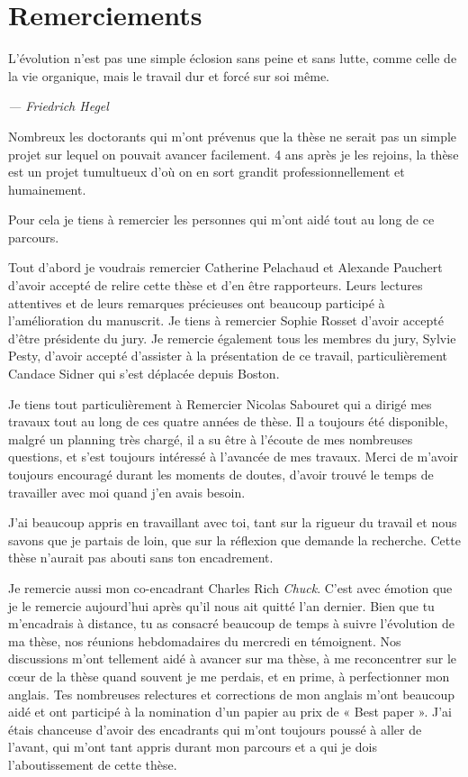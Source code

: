 \chapter{Remerciements}
\thispagestyle{empty}
{}

\vspace*{3cm}

\epigraph{L’évolution n’est pas une simple éclosion sans peine et sans lutte, comme celle de la vie organique, mais le travail dur et forcé sur soi même.}{\textit{    --- Friedrich Hegel	}}

\medskip

Nombreux les doctorants qui m'ont prévenus que la thèse ne serait pas un simple projet sur lequel on pouvait avancer facilement. 4 ans après je les rejoins, la thèse est un projet tumultueux d'où on en sort grandit professionnellement et humainement.

Pour cela je tiens à remercier les personnes qui m'ont aidé tout au long de ce parcours.

Tout d'abord je voudrais remercier Catherine Pelachaud et Alexande Pauchert d’avoir accepté de relire cette thèse et d’en être rapporteurs. Leurs lectures attentives et de leurs remarques précieuses ont beaucoup participé à l'amélioration du manuscrit. Je tiens à remercier Sophie Rosset d’avoir accepté d’être présidente du jury. Je remercie également tous les membres du jury, Sylvie Pesty, d’avoir accepté d’assister à la présentation de ce travail, particulièrement Candace Sidner qui s’est déplacée depuis Boston.

Je tiens tout particulièrement à Remercier Nicolas Sabouret qui a dirigé mes travaux tout au long de ces quatre années de thèse. 
Il a toujours été disponible, malgré un planning très chargé, il a su être à l’écoute de mes nombreuses questions, et s’est toujours intéressé à l’avancée de mes travaux. 
Merci de m'avoir toujours encouragé durant les moments de doutes, d'avoir trouvé le temps de travailler avec moi quand j'en avais besoin. 

J'ai beaucoup appris en travaillant avec toi, tant sur la rigueur du travail et nous savons que je partais de loin, que sur la réflexion que demande la recherche. 
Cette thèse n'aurait pas abouti sans ton encadrement. 

Je remercie aussi mon co-encadrant Charles Rich \emph{Chuck}. C'est avec émotion que je le remercie aujourd'hui après qu'il nous ait quitté l'an dernier. 
Bien que tu m'encadrais à distance, tu as consacré beaucoup de temps à suivre l’évolution de ma thèse, nos réunions hebdomadaires du mercredi en témoignent.  Nos discussions m’ont tellement aidé à avancer sur ma thèse, à me reconcentrer sur le cœur de la thèse quand souvent je me perdais, et en prime, à perfectionner mon anglais. Tes nombreuses relectures et corrections de mon anglais m’ont beaucoup aidé et ont participé à la nomination d’un papier au prix de « Best paper ».
J’ai étais chanceuse d’avoir des encadrants qui m’ont toujours poussé à aller de l’avant, qui m’ont tant appris durant mon parcours et a qui je dois l’aboutissement de cette thèse.

